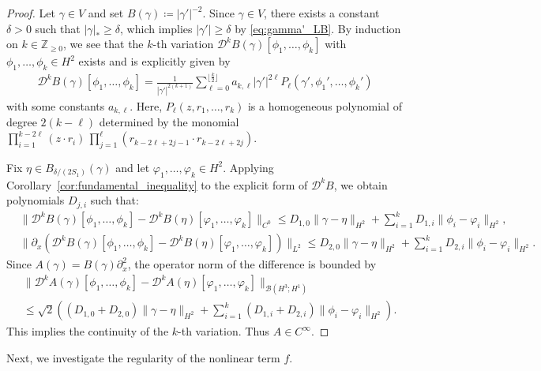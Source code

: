 \documentclass{article}
\theoremstyle{remark}
\theoremstyle{definition}
\numberwithin{equation}{section}
\begin{document}
\begin{proof}
    Let $\gamma\in V$ and set $B(\gamma)\coloneqq|\gamma'|^{-2}$.
    Since $\gamma\in V$, there exists a constant $\delta>0$ such that $|\gamma|_\ast\ge\delta$, which implies $|\gamma'|\ge\delta$ by \eqref{eq:gamma'_LB}.
    By induction on $k\in\mathbb{Z}_{\ge0}$, we see that the $k$-th variation $\mathcal{D}^kB(\gamma)[\phi_1,\ldots,\phi_k]$ with $\phi_1,\ldots,\phi_k\in H^2$ exists and is explicitly given by
    \begin{align*}
        \mathcal{D}^kB(\gamma)[\phi_1,\ldots,\phi_k]=\frac{1}{|\gamma'|^{2(k+1)}}\sum_{\ell=0}^{\lfloor\frac{k}{2}\rfloor}a_{k,\ell}|\gamma'|^{2\ell}P_\ell(\gamma',\phi_1',\ldots,\phi_k')
    \end{align*}
    with some constants $a_{k,\ell}$.
    Here, $P_\ell(z,r_1,\dots,r_k)$ is a homogeneous polynomial of degree $2(k-\ell)$ determined by the monomial $\prod_{i=1}^{k-2\ell}(z\cdot r_i)\,\prod_{j=1}^{\ell}(r_{k-2\ell+2j-1}\cdot r_{k-2\ell+2j})$.
    
    Fix $\eta\in B_{\delta/(2S_1)}(\gamma)$ and let $\varphi_1,\ldots,\varphi_k\in H^2$.
    Applying Corollary~\ref{cor:fundamental_inequality} to the explicit form of $\mathcal{D}^k B$, we obtain polynomials $D_{j,i}$ such that:
    \begin{align*}
        &\|\mathcal{D}^kB(\gamma)[\phi_1,\ldots,\phi_k]-\mathcal{D}^kB(\eta)[\varphi_1,\ldots,\varphi_k]\|_{C^0}
        \le D_{1,0}\|\gamma-\eta\|_{H^2}+\sum_{i=1}^kD_{1,i}\|\phi_i-\varphi_i\|_{H^2},\\
        &\|\partial_x\left(\mathcal{D}^kB(\gamma)[\phi_1,\ldots,\phi_k]-\mathcal{D}^kB(\eta)[\varphi_1,\ldots,\varphi_k]\right)\|_{L^2}
        \le D_{2,0}\|\gamma-\eta\|_{H^2}+\sum_{i=1}^kD_{2,i}\|\phi_i-\varphi_i\|_{H^2}.
    \end{align*}
    Since $A(\gamma)=B(\gamma)\partial_x^2$, the operator norm of the difference is bounded by
    \begin{align*}
        &\|\mathcal{D}^kA(\gamma)[\phi_1,\ldots,\phi_k]-\mathcal{D}^kA(\eta)[\varphi_1,\ldots,\varphi_k]\|_{\mathcal{B}(H^3;H^1)}\\
        &\le\sqrt{2}\left(\left(D_{1,0}+D_{2,0}\right)\|\gamma-\eta\|_{H^2}+\sum_{i=1}^k\left(D_{1,i}+D_{2,i}\right)\|\phi_i-\varphi_i\|_{H^2}\right).
    \end{align*}
    This implies the continuity of the $k$-th variation. Thus $A \in C^\infty$.
\end{proof}

Next, we investigate the regularity of the nonlinear term $f$.
\end{document}
